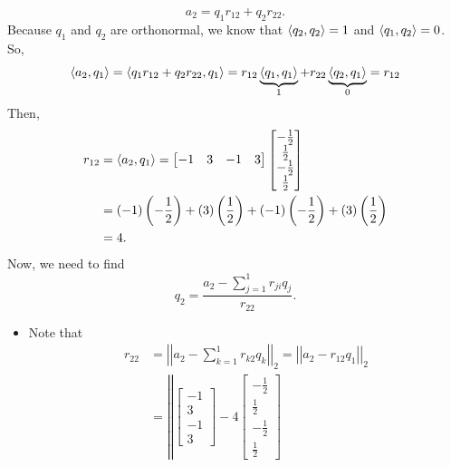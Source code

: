 \documentclass[letterpaper]{article}
\newcommand{\0}{\mathbf{0}}
\begin{document}
\begin{mdframed}
    \begin{mdframed}
        \[a_2 = q_1 r_{12} + q_2 r_{22}.\]
        Because $q_1$ and $q_2$ are orthonormal, we know that $\langle q_2, q_2 \rangle = 1$ and $\langle q_1, q_2 \rangle = 0$. So, \[\langle a_2, q_1 \rangle = \langle q_1 r_{12} + q_2 r_{22}, q_1 \rangle = r_{12} \underbrace{\langle q_1, q_1 \rangle}_{1} + r_{22} \underbrace{\langle q_2, q_1 \rangle}_{0} = r_{12}\]
        Then, 
        \begin{equation*}
            \begin{aligned}
                r_{12} &= \langle a_{2}, q_{1} \rangle= \begin{bmatrix}
                        -1 & 3 & -1 & 3
                    \end{bmatrix} \begin{bmatrix}
                        -\frac{1}{2} \\ \frac{1}{2} \\ -\frac{1}{2} \\ \frac{1}{2}
                    \end{bmatrix} \\ 
                    &= (-1) \left(-\frac{1}{2}\right) + (3) \left(\frac{1}{2}\right) + (-1)\left(-\frac{1}{2}\right) + (3)\left(\frac{1}{2}\right) \\ 
                    &= 4.
            \end{aligned}
        \end{equation*}
        Now, we need to find 
        \[q_2 = \frac{a_2 - \sum_{j = 1}^{1} r_{ji}q_j}{r_{22}}.\]
        \begin{itemize}
            \item Note that 
            \begin{equation*}
                \begin{aligned}
                    r_{22} &= \left|\left| a_2 - \sum_{k = 1}^{1} r_{k2} q_k \right|\right|_2 = \left|\left| a_2 - r_{12} q_1 \right|\right|_2 \\ 
                        &= \left|\left| \begin{bmatrix}
                            -1 \\ 3 \\ -1 \\ 3
                        \end{bmatrix} - 4 \begin{bmatrix}
                            -\frac{1}{2} \\ \frac{1}{2} \\ -\frac{1}{2} \\ \frac{1}{2}

\end{bmatrix}
\end{aligned}
\end{equation*}
\end{itemize}
\end{mdframed}
\end{mdframed}
\end{document}
